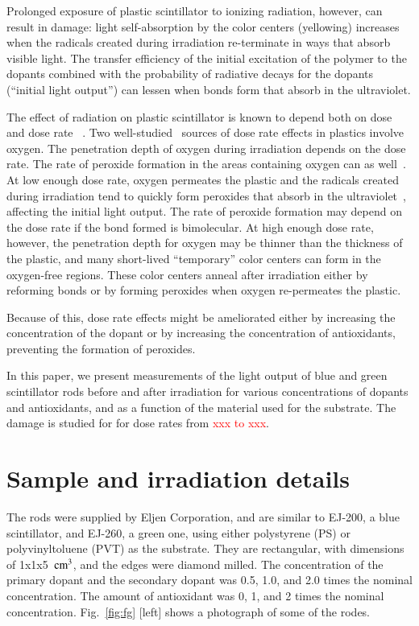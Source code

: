 \documentclass[review]{elsarticle}
\begin{document}
Prolonged exposure of plastic scintillator to
ionizing radiation, however, can result in damage:
light self-absorption by the color centers (yellowing) increases when the radicals created during irradiation re-terminate in ways that absorb visible light.
The transfer efficiency of the initial excitation of the polymer to the
dopants combined with the probability of radiative decays for the dopants (``initial light output'') can lessen
when bonds form that absorb in the ultraviolet.

The effect of radiation on plastic scintillator is known to depend
both on dose and dose rate ~\cite{sauli,34504,Wick1991472,289295,173180,173178,Giokaris1993315,gillen,1748-0221-11-10-T10004}.  
Two well-studied~\cite{clough1,bolland1,bolland2,bateman,cunliffe,Wick1991472,Biagtan1996125}
sources of dose rate effects in plastics
involve oxygen.   The penetration depth of oxygen
during irradiation depends on the dose rate.
The rate of peroxide
formation in the areas containing oxygen can as well~\cite{clough1}.
At low enough dose rate, oxygen permeates the plastic 
and the radicals created during irradiation tend to quickly
form peroxides that absorb in the ultraviolet~\cite{clough1}, affecting the initial light output.  
The rate of peroxide formation may depend on the dose rate if the bond formed is bimolecular.
At high enough dose rate, however, the penetration depth for oxygen may
be thinner than the thickness of the plastic, and many short-lived ``temporary'' color centers can form in the oxygen-free regions.  
These color centers anneal after irradiation either by reforming bonds or by forming peroxides when oxygen re-permeates the plastic.

Because of this, dose rate effects might be ameliorated either by increasing the concentration of the dopant or by increasing the concentration of antioxidants, preventing the formation of peroxides.


In this paper, we present measurements of the light output 
of blue and green scintillator rods 
before and after irradiation for various concentrations of dopants and antioxidants, and
as a function of the material used for the substrate.
The damage is studied for 
for dose rates from \textcolor{red}{xxx to xxx}.


\section{Sample and irradiation details}
The rods were supplied by Eljen Corporation, and
are similar to EJ-200, a blue scintillator, and EJ-260, a green one, using either
polystyrene (PS) or polyvinyltoluene (PVT) as the substrate.
They are rectangular, with dimensions of 1x1x5~$\rm{cm^3}$, 
and the edges were diamond milled.
The concentration of the primary dopant and the secondary dopant
was 0.5, 1.0, and 2.0 times the nominal concentration.
The amount of antioxidant was 0, 1, and 2 times the nominal concentration.
Fig.~\ref{fig:fg} [left] shows a photograph of some of the rodes.
\end{document}
